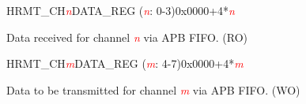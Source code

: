 \begin{register}{H}{RMT\_CH\textcolor{red}{\it{n}}DATA\_REG (\textcolor{red}{\it{n}}: 0-3)}{0x0000+4*\textcolor{red}{\it{n}}}\label{regdesc:RMTCHnDATAREG}
%
\regnewline%
\begin{regdesc}\begin{reglist}
\label{fielddesc:RMTCHNDATA}\item [RMT\_CH\textcolor{red}{\it{n}}DATA] Data received for channel \textcolor{red}{\it{n}} via APB FIFO. (RO)
\end{reglist}\end{regdesc}
\end{register}


\begin{register}{H}{RMT\_CH\textcolor{red}{\it{m}}DATA\_REG (\textcolor{red}{\it{m}}: 4-7)}{0x0000+4*\textcolor{red}{\it{m}}}\label{regdesc:RMTCHMDATAREG}
%
\regnewline%
\begin{regdesc}\begin{reglist}
\label{fielddesc:RMTCHMDATA}\item [RMT\_CH\textcolor{red}{\it{m}}DATA] Data to be transmitted for channel \textcolor{red}{\it{m}} via APB FIFO. (WO)
\end{reglist}\end{regdesc}
\end{register}


